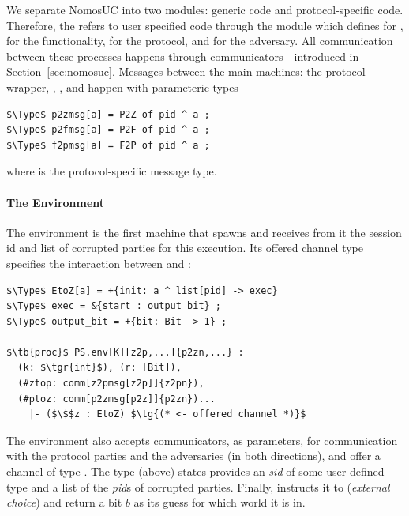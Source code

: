 We separate NomosUC into two modules: generic code and protocol-specific code. 
Therefore, the  refers to user specified code through the  module which defines  for \Z,  for the functionality,  for the protocol, and  for the adversary.
All communication between these processes happens through communicators---introduced in Section~\ref{sec:nomosuc}.
Messages between the main machines: the protocol wrapper, \A, \Z, and \F happen with parameteric types
\begin{lstlisting}[basicstyle=\small\BeraMonottFamily, frame=single, mathescape]
$\Type$ p2zmsg[a] = P2Z of pid ^ a ;
$\Type$ p2fmsg[a] = P2F of pid ^ a ;
$\Type$ f2pmsg[a] = F2P of pid ^ a ;
\end{lstlisting}
where  is the protocol-specific message type.

\paragraph{The Environment}
The environment is the first machine that  spawns and receives from it the session id and list of corrupted parties for this execution.
Its offered channel type  specifies the interaction between  and \Z:
\begin{lstlisting}[basicstyle=\small\BeraMonottFamily, mathescape, frame=single]
$\Type$ EtoZ[a] = +{init: a ^ list[pid] -> exec} 
$\Type$ exec = &{start : output_bit} ;
$\Type$ output_bit = +{bit: Bit -> 1} ;

$\tb{proc}$ PS.env[K][z2p,...]{p2zn,...} : 
  (k: $\tgr{int}$), (r: [Bit]), 
  (#ztop: comm[z2pmsg[z2p]]{z2pn}),
  (#ptoz: comm[p2zmsg[p2z]]{p2zn})...
    |- ($\$$z : EtoZ) $\tg{(* <- offered channel *)}$
\end{lstlisting}
The environment also accepts communicators, as parameters, for communication with the protocol parties and the adversaries (in both directions), and offer a channel  of type .
The type (above) states \Z provides an \emph{sid} of some user-defined type  and a list of the \emph{pid}s of corrupted parties. 
Finally,  instructs it to  (\emph{external choice}) and return a bit $b$ as its guess for which world it is in.


